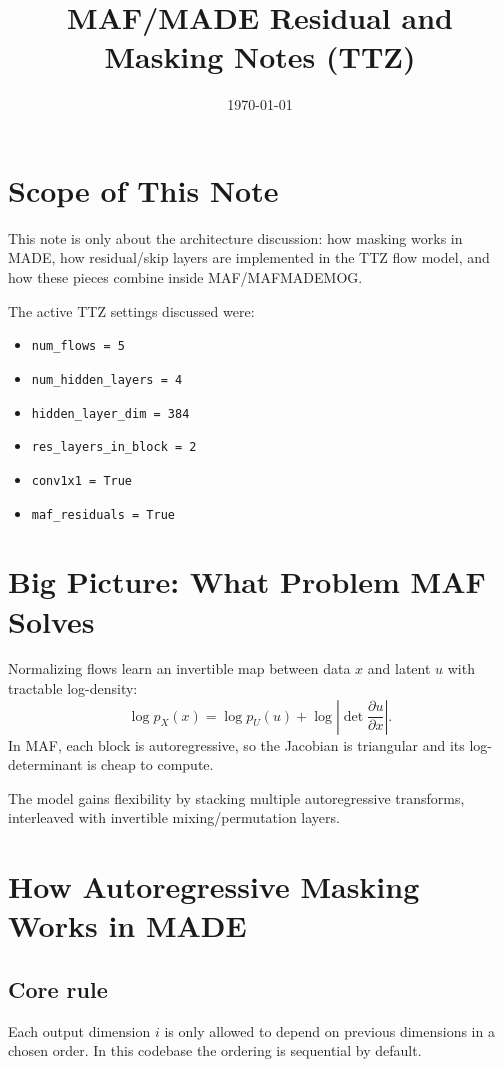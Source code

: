 \documentclass[11pt]{article}
\title{MAF/MADE Residual and Masking Notes (TTZ)}
\author{}
\date{\today}
\begin{document}
\maketitle

\section{Scope of This Note}
This note is only about the architecture discussion: how masking works in MADE,
how residual/skip layers are implemented in the TTZ flow model, and how these
pieces combine inside MAF/MAFMADEMOG.

The active TTZ settings discussed were:
\begin{itemize}[leftmargin=*]
\item \texttt{num\_flows = 5}
\item \texttt{num\_hidden\_layers = 4}
\item \texttt{hidden\_layer\_dim = 384}
\item \texttt{res\_layers\_in\_block = 2}
\item \texttt{conv1x1 = True}
\item \texttt{maf\_residuals = True}
\end{itemize}

\section{Big Picture: What Problem MAF Solves}
Normalizing flows learn an invertible map between data $x$ and latent $u$ with
tractable log-density:
\[
\log p_X(x) = \log p_U(u) + \log\left|\det\frac{\partial u}{\partial x}\right|.
\]
In MAF, each block is autoregressive, so the Jacobian is triangular and
its log-determinant is cheap to compute.

The model gains flexibility by stacking multiple autoregressive transforms,
interleaved with invertible mixing/permutation layers.

\section{How Autoregressive Masking Works in MADE}
\subsection*{Core rule}
Each output dimension $i$ is only allowed to depend on previous dimensions in a
chosen order. In this codebase the ordering is sequential by default.
\end{document}
